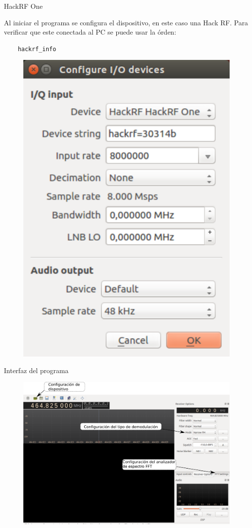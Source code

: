\begin{frame}{HackRF One}

Al iniciar el programa se configura el dispositivo, en este caso una Hack RF. Para verificar que este conectada al PC se puede usar la órden:

\begin{block}{}
  \texttt{
  \ \ \ hackrf\_info}
\end{block}

\begin{figure}[H]
\centering
\vspace{-3mm}
\includegraphics[width=.3\textwidth]{parte3/lab10/pdf/lab10_3.pdf}
\end{figure}

\end{frame}

\begin{frame}{Interfaz del programa}

\begin{figure}[H]
\centering
\vspace{-3mm}
\includegraphics[width=.9\textwidth]{parte3/lab10/pdf/lab10_4.pdf}
\end{figure}

\end{frame}

